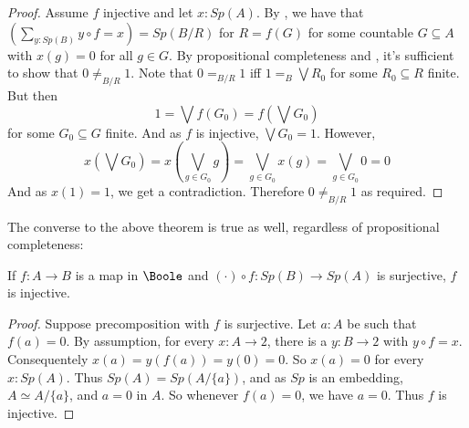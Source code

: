 \begin{proof}
  Assume $f$ injective and let $x:Sp(A)$.
  By , we have that $\left(\sum\limits_{y:Sp(B)} y\circ f = x \right) = Sp(B/R) $
  for $R=f(G)$ for some countable $G\subseteq A$ with $x(g) = 0$ for all $g\in G$. 
  By propositional completeness and , 
  it's sufficient to show that $0\neq_{B/R}1$. 
  Note that $0=_{B/R} 1$ iff 
  $1 =_B \bigvee R_0$ for some $R_0\subseteq R$ finite. 
  But then $$1 = \bigvee f(G_0) = f(\bigvee  G_0)$$ for some $G_0\subseteq G$ finite. 
  And as $f$ is injective, $\bigvee G_0 = 1$. 
  However, 
  $$
  x(\bigvee G_0) = 
  x(\bigvee_{g\in G_0} g ) = \bigvee_{g \in G_0} x(g) = \bigvee_{g\in G_0} 0 = 0$$
  And as $x(1) = 1$, we get a contradiction. Therefore $0\neq_{B/R} 1$ as required. 
\end{proof}  
The converse to the above theorem is true as well, regardless of propositional completeness:
\begin{lemma}\label{SurjectionsAreFormalSurjections}
If $f:A\to B$ is a map in $\Boole$ and $(\cdot) \circ f :Sp(B) \to Sp(A)$ is surjective, 
$f$ is injective. 
\end{lemma}
\begin{proof}
  Suppose precomposition with $f$ is surjective. 
  Let $a:A$ be such that $f(a)= 0$. 
  By assumption, for every $x:A\to 2$, there is a $y:B\to 2$ with $y\circ f = x$. 
  Consequentely $x(a) = y(f(a)) = y(0) = 0$. 
  So $x(a) = 0$ for every $x:Sp(A)$. 
  Thus $Sp(A) = Sp(A/\{a\})$, and as $Sp$ is an embedding, 
  $A \simeq A/\{a\}$, and $a = 0$ in $A$. 
  So whenever $f(a) = 0$, we have $a=0$. Thus $f$ is injective. 
\end{proof}


